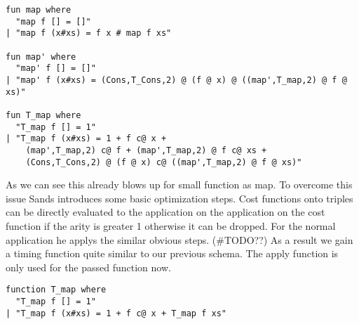 \begin{lstlisting}[language=isabelle,mathescape=true,label=lst:curried_map_example,caption=Example translation for map function]
fun map where
  "map f [] = []"
| "map f (x#xs) = f x # map f xs"

fun map' where
  "map' f [] = []"
| "map' f (x#xs) = (Cons,T_Cons,2) @ (f @ x) @ ((map',T_map,2) @ f @ xs)"

fun T_map where
  "T_map f [] = 1"
| "T_map f (x#xs) = 1 + f c@ x +
    (map',T_map,2) c@ f + (map',T_map,2) @ f c@ xs +
    (Cons,T_Cons,2) @ (f @ x) c@ ((map',T_map,2) @ f @ xs)"
\end{lstlisting}

As we can see this already blows up for small function as map.
To overcome this issue Sands introduces some basic optimization steps.
Cost functions onto triples can be directly evaluated to the application on the application on the cost function if the arity is greater 1 otherwise it can be dropped.
For the normal application he applys the similar obvious steps. (\#TODO??)
As a result we gain a timing function quite similar to our previous schema.
The apply function is only used for the passed function now.
\begin{lstlisting}[language=isabelle,mathescape=true]
function T_map where
  "T_map f [] = 1"
| "T_map f (x#xs) = 1 + f c@ x + T_map f xs"
\end{lstlisting}
